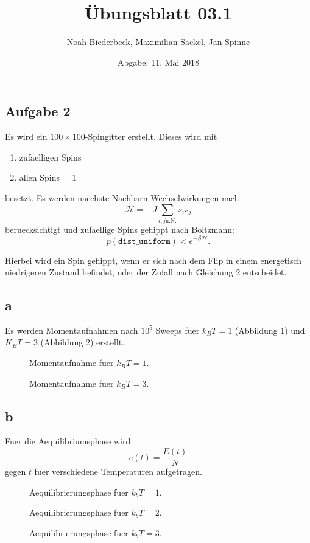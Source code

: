 \documentclass{scrartcl}
\title{Übungsblatt 03.1}
\author{%
  Noah Biederbeck, Maximilian Sackel, Jan Spinne
}
\date{Abgabe: 11. Mai 2018}
\begin{document}
\maketitle

\subsection*{Aufgabe 2}%
\label{sec:aufgabe_2}
Es wird ein $100 \times 100$-Spingitter erstellt.
Dieses wird mit
\begin{enumerate}
  \item zufaelligen Spins
  \item allen Spins = 1
\end{enumerate}
besetzt.
Es werden naechste Nachbarn Wechselwirkungen nach
\begin{equation}
  \mathcal{H} = -J \sum_{i, j \text{n.N.}} s_i s_j
\end{equation}
beruecksichtigt und zufaellige Spins geflippt nach Boltzmann:
\begin{equation}
  p(\texttt{dist\_uniform}) < e^{-\beta \mathcal{H}}.
\end{equation}

Hierbei wird ein Spin geflippt, wenn er sich nach dem Flip in einem energetisch niedrigeren Zustand befindet, oder der Zufall nach Gleichung 2 entscheidet.
\subsection*{a}%
\label{sub:a}
Es werden Momentaufnahmen nach $10^5$ Sweeps fuer $k_B T = 1$ (Abbildung 1) und $K_B T = 3$ (Abbildung 2) erstellt.
\begin{figure}[ht]
  \centering
  \caption{Momentaufnahme fuer $k_B T = 1$.}
\end{figure}
\begin{figure}[ht]
  \centering
  \caption{Momentaufnahme fuer $k_B T = 3$.}
\end{figure}

\subsection*{b}
Fuer die Aequilibriumsphase wird
\begin{equation}
  e(t) = \frac{E(t)}{N}
\end{equation}
gegen $t$ fuer verschiedene Temperaturen aufgetragen.
\begin{figure}[ht]
  \centering
  \caption{Aequilibrierungsphase fuer $k_b T = 1$.}
\end{figure}
\begin{figure}[ht]
  \centering
  \caption{Aequilibrierungsphase fuer $k_b T = 2$.}
\end{figure}
\begin{figure}[ht]
  \centering
  \caption{Aequilibrierungsphase fuer $k_b T = 3$.}
\end{figure}
\end{document}
